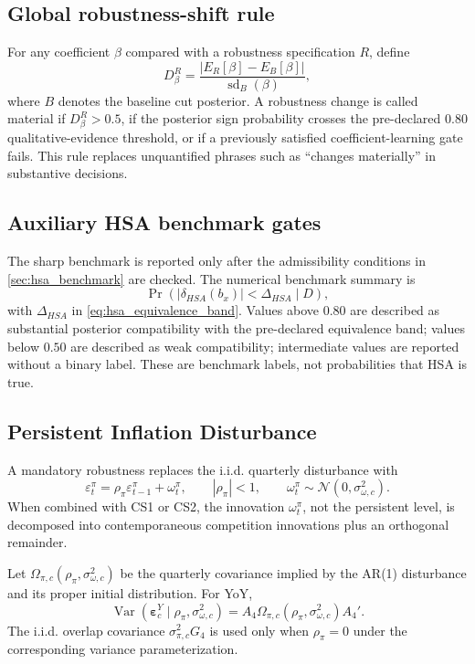 \documentclass[11pt]{article}
\newcommand{\Var}{\operatorname{Var}}
\newcommand{\Normal}{\mathcal{N}}
\begin{document}
\subsection{Global robustness-shift rule}
For any coefficient $\beta$ compared with a robustness specification $R$, define
\begin{equation}
D_\beta^R
=
\frac{|E_R[\beta]-E_B[\beta]|}{\operatorname{sd}_B(\beta)},
\end{equation}
where $B$ denotes the baseline cut posterior. A robustness change is called material if $D_\beta^R>0.5$, if the posterior sign probability crosses the pre-declared $0.80$ qualitative-evidence threshold, or if a previously satisfied coefficient-learning gate fails. This rule replaces unquantified phrases such as ``changes materially'' in substantive decisions.

\subsection{Auxiliary HSA benchmark gates}
The sharp benchmark is reported only after the admissibility conditions in \cref{sec:hsa_benchmark} are checked. The numerical benchmark summary is
\begin{equation}
\Pr\!\left(|\delta_{HSA}(b_x)|<\Delta_{HSA}\mid D\right),
\end{equation}
with $\Delta_{HSA}$ in \cref{eq:hsa_equivalence_band}. Values above $0.80$ are described as substantial posterior compatibility with the pre-declared equivalence band; values below $0.50$ are described as weak compatibility; intermediate values are reported without a binary label. These are benchmark labels, not probabilities that HSA is true.

\subsection{Persistent Inflation Disturbance}

A mandatory robustness replaces the i.i.d. quarterly disturbance with
\begin{equation}
\varepsilon_t^\pi=\rho_\pi\varepsilon_{t-1}^\pi+\omega_t^\pi,
\qquad |\rho_\pi|<1,
\qquad \omega_t^\pi\sim\Normal(0,\sigma_{\omega,c}^2).
\end{equation}
When combined with CS1 or CS2, the innovation $\omega_t^\pi$, not the persistent level, is decomposed into contemporaneous competition innovations plus an orthogonal remainder.

Let $\Omega_{\pi,c}(\rho_\pi,\sigma_{\omega,c}^2)$ be the quarterly covariance implied by the AR(1) disturbance and its proper initial distribution. For YoY,
\begin{equation}
\Var(\bm\varepsilon_c^Y\mid\rho_\pi,\sigma_{\omega,c}^2)
=
A_4\Omega_{\pi,c}(\rho_\pi,\sigma_{\omega,c}^2)A_4'.
\label{eq:yoy_ar1_covariance}
\end{equation}
The i.i.d. overlap covariance $\sigma_{\pi,c}^2G_4$ is used only when $\rho_\pi=0$ under the corresponding variance parameterization.
\end{document}
